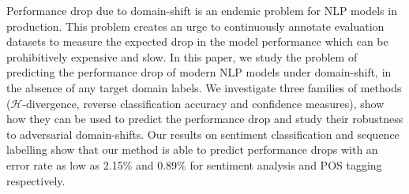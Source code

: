 Performance drop due to domain-shift is an endemic problem for NLP models in production.
This problem creates an urge to continuously annotate evaluation datasets to measure the expected drop in the model performance which can be prohibitively expensive and slow.
In this paper, we study the problem of predicting the performance drop of modern NLP models under domain-shift, in the absence of any target domain labels.
We investigate three families of methods ($\mathcal{H}$-divergence, reverse classification accuracy and confidence measures), show how they can be used to predict the performance drop and study their robustness to adversarial domain-shifts. Our results on sentiment classification and sequence labelling show that our method is able to predict performance drops with an error rate as low as 2.15\% and 0.89\% for sentiment analysis and POS tagging respectively.
